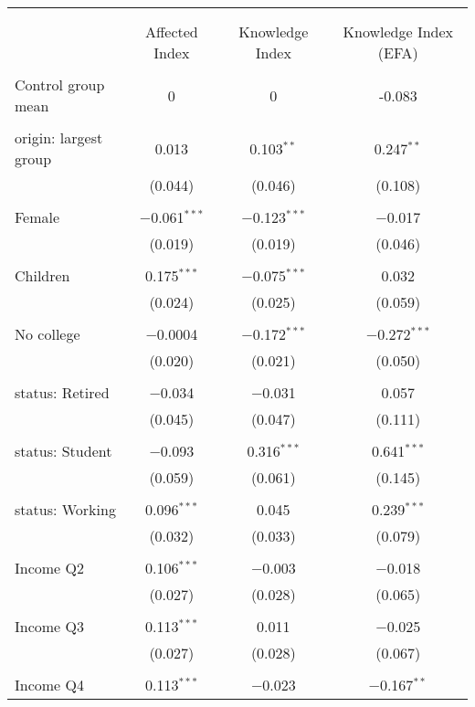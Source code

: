 
\begin{tabular}{@{\extracolsep{5pt}}lccc} 
\\[-1.8ex]\hline 
\hline \\[-1.8ex] 
\\[-1.8ex] & Affected Index & Knowledge Index & Knowledge Index (EFA) \\ 
\hline \\[-1.8ex] 
 Control group mean & 0 & 0 & -0.083  \\ \hline \\[-1.8ex] origin: largest group & 0.013 & 0.103$^{**}$ & 0.247$^{**}$ \\ 
  & (0.044) & (0.046) & (0.108) \\ 
  & & & \\ 
 Female & $-$0.061$^{***}$ & $-$0.123$^{***}$ & $-$0.017 \\ 
  & (0.019) & (0.019) & (0.046) \\ 
  & & & \\ 
 Children & 0.175$^{***}$ & $-$0.075$^{***}$ & 0.032 \\ 
  & (0.024) & (0.025) & (0.059) \\ 
  & & & \\ 
 No college & $-$0.0004 & $-$0.172$^{***}$ & $-$0.272$^{***}$ \\ 
  & (0.020) & (0.021) & (0.050) \\ 
  & & & \\ 
 status: Retired & $-$0.034 & $-$0.031 & 0.057 \\ 
  & (0.045) & (0.047) & (0.111) \\ 
  & & & \\ 
 status: Student & $-$0.093 & 0.316$^{***}$ & 0.641$^{***}$ \\ 
  & (0.059) & (0.061) & (0.145) \\ 
  & & & \\ 
 status: Working & 0.096$^{***}$ & 0.045 & 0.239$^{***}$ \\ 
  & (0.032) & (0.033) & (0.079) \\ 
  & & & \\ 
 Income Q2 & 0.106$^{***}$ & $-$0.003 & $-$0.018 \\ 
  & (0.027) & (0.028) & (0.065) \\ 
  & & & \\ 
 Income Q3 & 0.113$^{***}$ & 0.011 & $-$0.025 \\ 
  & (0.027) & (0.028) & (0.067) \\ 
  & & & \\ 
 Income Q4 & 0.113$^{***}$ & $-$0.023 & $-$0.167$^{**}$ \\ 

\end{tabular}
